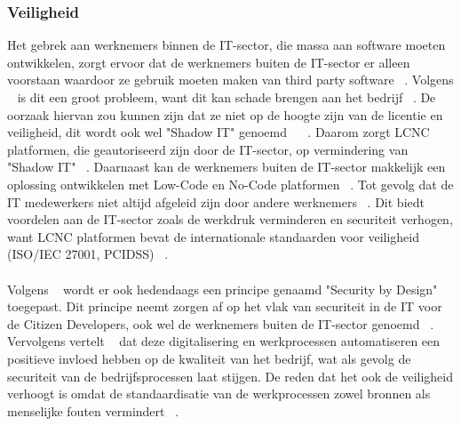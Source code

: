 \subsubsection{Veiligheid}
\label{subsec:veiligheid}
Het gebrek aan werknemers binnen de IT-sector, die massa aan software moeten ontwikkelen, 
zorgt ervoor dat de werknemers buiten de IT-sector er alleen voorstaan waardoor ze gebruik moeten maken van third party software ~\autocite{Yan2021}. 
Volgens ~\textcite{Yan2021} is dit een groot probleem, want dit kan schade brengen aan het bedrijf ~\autocite{Yan2021}. 
De oorzaak hiervan zou kunnen zijn dat ze niet op de hoogte zijn van de licentie en veiligheid, dit wordt ook wel "Shadow IT" genoemd 
~\autocite{Yan2021} ~\autocite{Rokis_2022}. Daarom zorgt LCNC platformen, die geautoriseerd zijn door de IT-sector, op vermindering van "Shadow IT" ~\autocite{Yan2021}. 
Daarnaast kan de werknemers buiten de IT-sector makkelijk een oplossing ontwikkelen met Low-Code en No-Code platformen ~\autocite{Yan2021}. 
Tot gevolg dat de IT medewerkers niet altijd afgeleid zijn door andere werknemers ~\autocite{Yan2021}. 
Dit biedt voordelen aan de IT-sector zoals de werkdruk verminderen en securiteit verhogen, 
want LCNC platformen bevat de internationale standaarden voor veiligheid (ISO/IEC 27001, PCIDSS) ~\autocite{Sufi_2023}.
\\
\\
Volgens ~\textcite{Sufi_2023} wordt er ook hedendaags een principe genaamd "Security by Design" toegepast. 
Dit principe neemt zorgen af op het vlak van securiteit in de IT voor de Citizen Developers, ook wel de werknemers buiten de IT-sector genoemd ~\autocite{Sufi_2023}. 
Vervolgens vertelt ~\textcite{Elshan2023} dat deze digitalisering en werkprocessen automatiseren een positieve invloed hebben op de kwaliteit van het bedrijf, wat als gevolg 
de securiteit van de bedrijfsprocessen laat stijgen. De reden dat het ook de veiligheid verhoogt is omdat de standaardisatie van de werkprocessen zowel bronnen 
als menselijke fouten vermindert ~\autocite{Elshan2023}.
